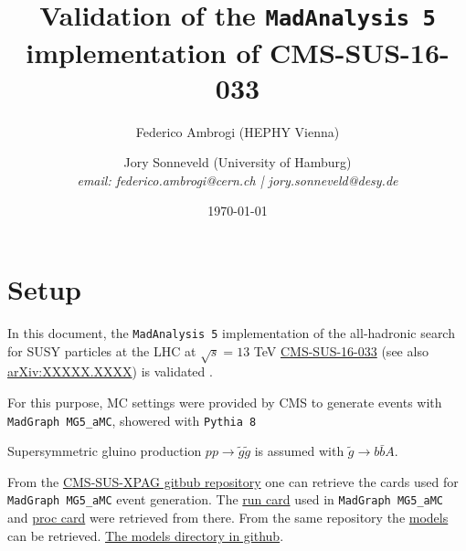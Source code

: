 \documentclass[12pt,A4paper]{article}
\title{Validation of the \texttt{MadAnalysis 5} implementation of CMS-SUS-16-033}
\author{Federico Ambrogi (HEPHY Vienna) \and Jory Sonneveld (University of Hamburg)\\
\normalsize {\it email: federico.ambrogi@cern.ch | jory.sonneveld@desy.de}
\date{\today}
}
\newcommand{\go}{{\widetilde{g}}}
\begin{document}
        \maketitle


\section{Setup}
In this document, the \texttt{MadAnalysis 5} implementation of the all-hadronic search for SUSY particles at the
LHC at $\sqrt{s}=13$ TeV
\href{http://cms-results.web.cern.ch/cms-results/public-results/preliminary-results/SUS-16-033/index.html}{CMS-SUS-16-033}
(see also \href{http://arxiv.org/abs/XXXXX.XXXX}{arXiv:XXXXX.XXXX})
is validated%
.

For this purpose, MC settings were provided by CMS to generate events with \texttt{MadGraph MG5\_aMC}, showered with \texttt{Pythia 8}


Supersymmetric gluino production  $p p \to \go \go$ is assumed with $\go \to b\bar{b}A$.

From the \href{https://github.com/CMS-SUS-XPAG/GenLHEfiles/}{CMS-SUS-XPAG gitbub repository} one can retrieve the cards used for \texttt{MadGraph MG5\_aMC} event generation.
The \href{https://github.com/CMS-SUS-XPAG/GenLHEfiles/blob/master/GridpackWorkflow/production/SMS-GlGl/templatecards/SMS-GlGl_run_card.dat}{run card} used in \texttt{MadGraph MG5\_aMC} and \href{https://github.com/CMS-SUS-XPAG/GenLHEfiles/blob/master/GridpackWorkflow/production/SMS-GlGl/templatecards/SMS-GlGl_proc_card.dat}{proc card} were retrieved from there.
From the same repository the \href{https://github.com/CMS-SUS-XPAG/GenLHEfiles/tree/master/GridpackWorkflow/production/models}{models} can be retrieved.
\href{https://github.com/CMS-SUS-XPAG/GenLHEfiles/tree/593104be96b2963984328bf855ee19f39bcce5ed/GridpackWorkflow/production/models}{The models directory in github}.
\end{document}
